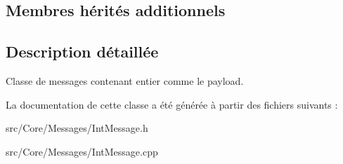 \subsection*{Membres hérités additionnels}


\subsection{Description détaillée}
Classe de messages contenant entier comme le payload. 

La documentation de cette classe a été générée à partir des fichiers suivants \-:\begin{DoxyCompactItemize}
\item 
src/\-Core/\-Messages/Int\-Message.\-h\item 
src/\-Core/\-Messages/Int\-Message.\-cpp\end{DoxyCompactItemize}
